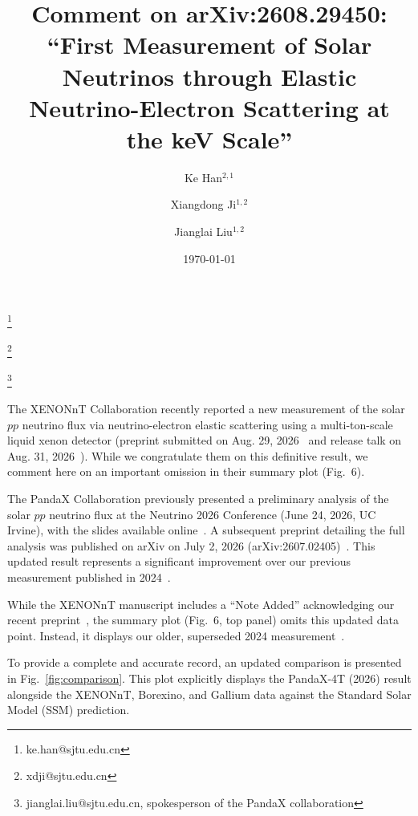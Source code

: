 \documentclass[PRD,amsmath,amssymb,preprintnumbers,nofootinbib,floatfix,uperscriptaddress]{revtex4-2}
\begin{document}
\title{Comment on arXiv:2608.29450: ``First Measurement of Solar Neutrinos through Elastic Neutrino-Electron Scattering at the keV Scale''}

\author{Ke Han$^{2,1}$}
\thanks{ke.han@sjtu.edu.cn}
\author{Xiangdong Ji$^{1,2}$}
\thanks{xdji@sjtu.edu.cn}
\author{Jianglai Liu$^{1,2}$}
\thanks{jianglai.liu@sjtu.edu.cn, spokesperson of the PandaX collaboration}



\date{\today}

\maketitle

The XENONnT Collaboration recently reported a new measurement of the solar \(pp\) neutrino flux via neutrino-electron elastic scattering using a multi-ton-scale liquid xenon detector (preprint submitted on Aug. 29, 2026~\cite{xenon} and release talk on Aug. 31, 2026~\cite{xenon-seminar}). While we congratulate them on this definitive result, we comment here on an important omission in their summary plot (Fig.~6).

The PandaX Collaboration previously presented a preliminary analysis of the solar $pp$ neutrino flux at the Neutrino 2026 Conference (June 24, 2026, UC Irvine), with the slides available online~\cite{han_talk}. A subsequent preprint detailing the full analysis was published on arXiv on July 2, 2026 (arXiv:2607.02405)~\cite{pandax2026}. This updated result represents a significant improvement over our previous measurement published in 2024~\cite{pandax2024}.

While the XENONnT manuscript includes a ``Note Added'' acknowledging our recent preprint~\cite{pandax2026}, the summary plot (Fig.~6, top panel) omits this updated data point. Instead, it displays our older, superseded 2024 measurement~\cite{pandax2024}. 

To provide a complete and accurate record, an updated comparison is presented in Fig.~\ref{fig:comparison}. This plot explicitly displays the PandaX-4T (2026) result alongside the XENONnT, Borexino, and Gallium data against the Standard Solar Model (SSM) prediction. 
\end{document}
